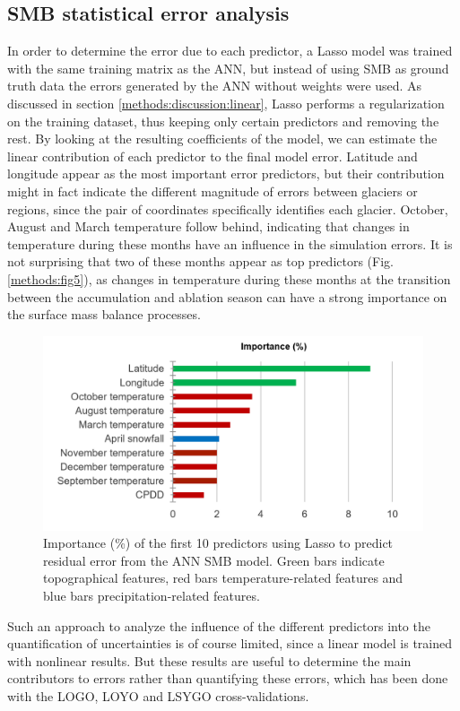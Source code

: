 \subsection{SMB statistical error analysis}

In order to determine the error due to each predictor, a Lasso model was trained with the same training matrix as the ANN, but instead of using SMB as ground truth data the errors generated by the ANN without weights were used. As discussed in section \ref{methods:discussion:linear}, Lasso performs a regularization on the training dataset, thus keeping only certain predictors and removing the rest. By looking at the resulting coefficients of the model, we can estimate the linear contribution of each predictor to the final model error. Latitude and longitude appear as the most important error predictors, but their contribution might in fact indicate the different magnitude of errors between glaciers or regions, since the pair of coordinates specifically identifies each glacier. October, August and March temperature follow behind, indicating that changes in temperature during these months have an influence in the simulation errors. It is not surprising that two of these months appear as top predictors (Fig. \ref{methods:fig5}), as changes in temperature during these months at the transition between the accumulation and ablation season can have a strong importance on the surface mass balance processes. 

\begin{figure}[h]
\centering
\includegraphics[width=12cm]{Figures/methods/Figure_S1.png}
\caption{Importance (\%) of the first 10 predictors using Lasso to predict residual error from the ANN SMB model. Green bars indicate topographical features, red bars temperature-related features and blue bars precipitation-related features.}
\end{figure}

Such an approach to analyze the influence of the different predictors into the quantification of uncertainties is of course limited, since a linear model is trained with nonlinear results. But these results are useful to determine the main contributors to errors rather than quantifying these errors, which has been done with the LOGO, LOYO and LSYGO cross-validations. 


